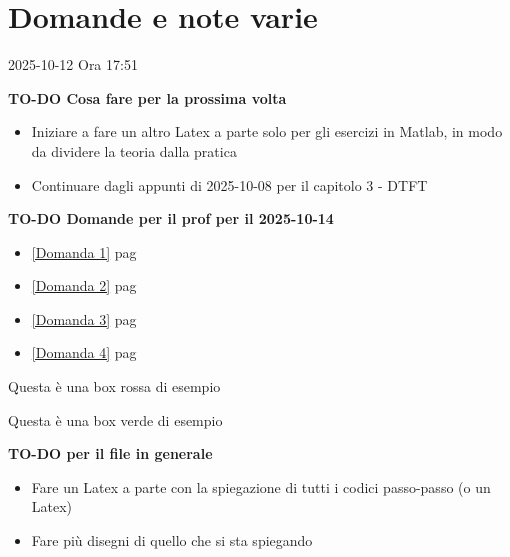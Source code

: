\section*{Domande e note varie}

2025-10-12 Ora 17:51 \newline 

\textbf{TO-DO Cosa fare per la prossima volta} 

\begin{itemize}
    \item Iniziare a fare un altro Latex a parte solo per gli esercizi in Matlab, in modo da dividere la teoria dalla pratica 
    \item Continuare dagli appunti di 2025-10-08 per il capitolo 3 - DTFT 
\end{itemize}

\textbf{TO-DO Domande per il prof per il 2025-10-14} 

\begin{itemize}
    \item \ref{Domanda 1}  pag \pageref{Domanda 1}  
    \item \ref{Domanda 2}  pag \pageref{Domanda 2} 
    \item \ref{Domanda 3}  pag \pageref{Domanda 3} 
    \item \ref{Domanda 4}  pag \pageref{Domanda 4} 
\end{itemize}


\begin{tcolorbox}[colback=red!5!white,colframe=red!75!black]
Questa è una box rossa di esempio
\end{tcolorbox}

\begin{tcolorbox}[colback=green!5!white,colframe=green!75!black]
Questa è una box verde di esempio
\end{tcolorbox} 

\textbf{TO-DO per il file in generale}

\begin{itemize}
    \item Fare un Latex a parte con la spiegazione di tutti i codici passo-passo (o un Latex) 
    \item Fare più disegni di quello che si sta spiegando
\end{itemize}

\newpage 